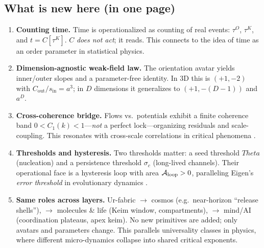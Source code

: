 \documentclass[12pt,a4paper,oneside]{scrreprt}
\def\Theta{Theta}%
\begin{document}
\subsection*{What is new here (in one page)}
\begin{enumerate}
  \item \textbf{Counting time.} Time is operationalized as counting of real events: $\tau^O$, $\tau^K$, and $t = C[\tau^K]$. $C$ \emph{does not act}; it reads. 
  This connects to the idea of time as an order parameter in statistical physics.
  \item \textbf{Dimension-agnostic weak-field law.} The orientation avatar yields inner/outer slopes and a parameter-free identity. 
  In 3D this is $(+1,-2)$ with $C_{\mathrm{out}}/s_{\mathrm{in}}=a^3$; in $D$ dimensions it generalizes to $(+1,-(D{-}1))$ and $a^{D}$.
  \item \textbf{Cross-coherence bridge.} Flows vs.\ potentials exhibit a finite coherence band $0<C_1(k)<1$---\emph{not} a perfect lock---organizing residuals and scale-coupling. 
  This resonates with cross-scale correlations in critical phenomena \citep{Wilson1971RG,Kadanoff1966}.
  \item \textbf{Thresholds and hysteresis.} Two thresholds matter: a seed threshold $\Theta$ (nucleation) and a persistence threshold $\sigma_c$ (long-lived channels). 
  Their operational face is a hysteresis loop with area $\mathcal A_{\rm loop}>0$, paralleling Eigen's \emph{error threshold} in evolutionary dynamics \citep{Eigen1971,Szathmary1995}.
  \item \textbf{Same roles across layers.} Ur-fabric $\to$ cosmos (e.g.\ near-horizon “release shells”), $\to$ molecules \& life (Keim window, compartments), $\to$ mind/AI (coordination plateaus, apex keim). 
  No new primitives are added; only avatars and parameters change. 
  This parallels universality classes in physics, where different micro-dynamics collapse into shared critical exponents.
\end{enumerate}
\end{document}
